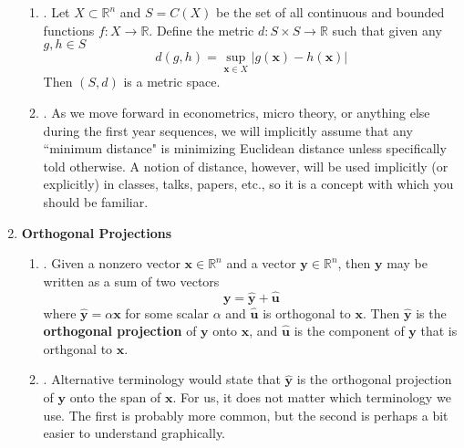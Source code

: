 \documentclass[12pt]{article}
\begin{document}
\begin{enumerate}
\begin{enumerate}
	\item\underline{}.
		Let $X \subset \mathbb{R}^n$ and $S=C(X)$ be the set of all continuous and bounded functions $f:X \to \mathbb{R}$.  Define the metric $d:S\times S \to \mathbb{R}$ such that given any $g, h \in S$
		\[ d(g,h) = \sup_{\mathbf{x}\in X} |g(\mathbf{x}) - h(\mathbf{x})| \]
		Then $(S,d)$ is a metric space.
	
	\item\underline{}.
		As we move forward in econometrics, micro theory, or anything else during the first year sequences, we will implicitly assume that any ``minimum distance" is minimizing Euclidean distance unless specifically told otherwise. A notion of distance, however, will be used implicitly (or explicitly) in classes, talks, papers, etc., so it is a concept with which you should be familiar.
	\end{enumerate}

\item\textbf{Orthogonal Projections}
	\begin{enumerate}
		\item\underline{}.
		Given a nonzero vector $\mathbf{x}\in\mathbb{R}^n$ and a vector $\mathbf{y}\in\mathbb{R}^n$, then $\mathbf{y}$ may be written as a sum of two vectors
		\[\mathbf{y}=\hat{\mathbf{y}}+\hat{\mathbf{u}}\]
		where $\hat{\mathbf{y}}=\alpha\mathbf{x}$ for some scalar $\alpha$ and $\hat{\mathbf{u}}$ is orthogonal to $\mathbf{x}$.
		Then $\hat{\mathbf{y}}$ is the \textbf{orthogonal projection} of $\mathbf{y}$ onto $\mathbf{x}$, and $\hat{\mathbf{u}}$ is the component of $\mathbf{y}$ that is orthgonal to $\mathbf{x}$.
		
		\item\underline{}.
		Alternative terminology would state that $\hat{\mathbf{y}}$ is the orthogonal projection of $\mathbf{y}$ onto the span of $\mathbf{x}$. For us, it does not matter which terminology we use. The first is probably more common, but the second is perhaps a bit easier to understand graphically.


\end{enumerate}
\end{enumerate}
\end{document}
